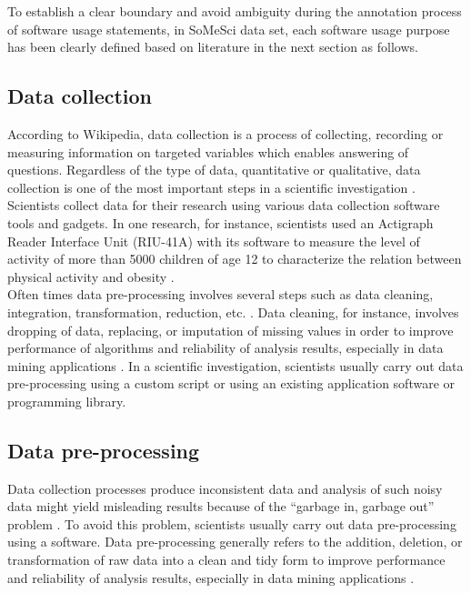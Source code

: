 To establish a clear boundary and avoid ambiguity during the annotation process of software usage statements, in \ac{SoMeSci} data set, each software usage purpose has been clearly defined based on literature in the next section as follows. 


\subsection{Data collection}
\label{sec:purpose:Types:datacollection}


According to Wikipedia, data collection is a process of collecting, recording or measuring information on targeted variables which enables answering of questions. Regardless of the type of data, quantitative or qualitative, data collection is one of the most important steps in a scientific investigation \citep{enwiki:1049936190}. \\

Scientists collect data for their research using various data collection software tools and gadgets. In one research, for instance, scientists used an Actigraph Reader Interface Unit (RIU-41A) with its software to measure the level of activity of more than 5000 children of age 12 to characterize the relation between physical activity and obesity \citep{ness2007objectively,ibanez2018survey}. \\

Often times data pre-processing involves several steps such as data cleaning, integration, transformation, reduction, etc. \citep{malley2016data}. Data cleaning, for instance, involves dropping of data, replacing, or imputation of missing values in order to improve performance of algorithms and reliability of analysis results, especially in data mining applications \citep{enwiki:1051181443, enwiki:1056727993}. In a scientific investigation, scientists usually carry out data pre-processing using a custom script or using an existing application software or programming library. \\

\subsection{Data pre-processing}
\label{sec:purpose:Types:prepro}

Data collection processes produce inconsistent data and analysis of such noisy data might yield misleading results because of the “garbage in, garbage out” problem \citep{enwiki:1059558941}. To avoid this problem, scientists usually carry out data pre-processing using a software. Data pre-processing generally refers to the addition, deletion, or transformation of raw data into a clean and tidy form to improve performance and reliability of analysis results, especially in data mining applications \citep{kuhn2013data,rinnan2009data}. \\

